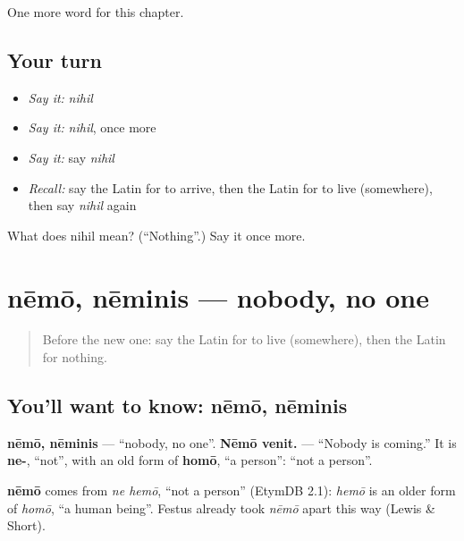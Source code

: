 \begin{grammarlens}[title={What you've built}]
One more word for this chapter.
\end{grammarlens}

\subsection*{Your turn}
\begin{itemize}
\raggedright
  \item \emph{Say it:} \emph{nihil}
  \item \emph{Say it:} \emph{nihil}, once more
  \item \emph{Say it:} say \emph{nihil}
  \item \emph{Recall:} say the Latin for to arrive, then the Latin for to live (somewhere), then say \emph{nihil} again
\end{itemize}

\begin{tcolorbox}[breakable,colback=teal!4,colframe=teal!35!black,title={Before you move on}]
What does nihil mean? (\textquotedblleft{}Nothing\textquotedblright{}.) Say it once more.
\end{tcolorbox}
\section[nēmō, nēminis]{nēmō, nēminis — nobody, no one}

\label{lesson:LA-C161-nemo}



\begin{quote}
Before the new one: say the Latin for to live (somewhere), then the Latin for nothing.
\end{quote}

\subsection*{You'll want to know: nēmō, nēminis}
\textbf{nēmō, nēminis} — \textquotedblleft{}nobody, no one\textquotedblright{}. \textbf{Nēmō venit.} — \textquotedblleft{}Nobody is coming.\textquotedblright{} It is \textbf{ne-}, \textquotedblleft{}not\textquotedblright{}, with an old form of \textbf{homō}, \textquotedblleft{}a person\textquotedblright{}: \textquotedblleft{}not a person\textquotedblright{}.

\begin{cousinweb}
\textbf{nēmō} comes from \emph{ne hemō}, \textquotedblleft{}not a person\textquotedblright{} (EtymDB 2.1): \emph{hemō} is an older form of \emph{homō}, \textquotedblleft{}a human being\textquotedblright{}. Festus already took \emph{nēmō} apart this way (Lewis \& Short).
\end{cousinweb}


